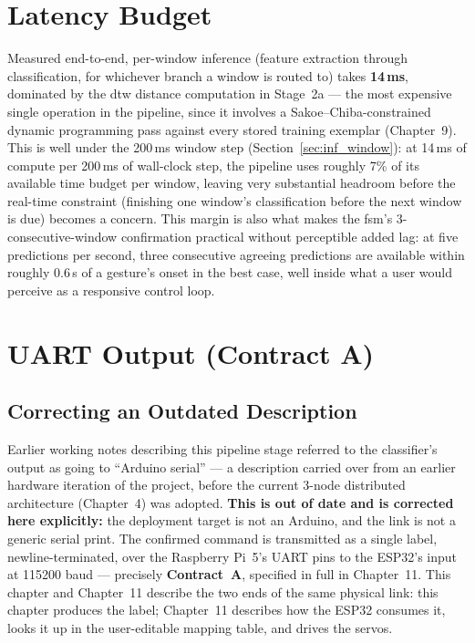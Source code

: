 \section{Latency Budget}
\label{sec:inf_latency}

Measured end-to-end, per-window inference (feature extraction
through classification, for whichever branch a window is routed to)
takes \textbf{14\,ms}, dominated by the \acrshort{dtw} distance
computation in Stage~2a --- the most expensive single operation in
the pipeline, since it involves a Sakoe--Chiba-constrained dynamic
programming pass against every stored training exemplar
(Chapter~9). This is well under the 200\,ms window step
(Section~\ref{sec:inf_window}): at 14\,ms of compute per 200\,ms of
wall-clock step, the pipeline uses roughly 7\% of its available time
budget per window, leaving very substantial headroom before the
real-time constraint (finishing one window's classification before
the next window is due) becomes a concern. This margin is also what
makes the \acrshort{fsm}'s 3-consecutive-window confirmation
practical without perceptible added lag: at five predictions per
second, three consecutive agreeing predictions are available within
roughly 0.6\,s of a gesture's onset in the best case, well inside
what a user would perceive as a responsive control loop.

\section{UART Output (Contract A)}
\label{sec:inf_uart}

\subsection{Correcting an Outdated Description}

Earlier working notes describing this pipeline stage referred to
the classifier's output as going to ``Arduino serial'' --- a
description carried over from an earlier hardware iteration of the
project, before the current 3-node distributed architecture
(Chapter~4) was adopted. \textbf{This is out of date and is
corrected here explicitly:} the deployment target is not an
Arduino, and the link is not a generic serial print. The confirmed
command is transmitted as a single 
label, newline-terminated, over the Raspberry Pi~5's UART pins to
the ESP32's  input at 115200 baud --- precisely
\textbf{Contract~A}, specified in full in Chapter~11. This chapter
and Chapter~11 describe the two ends of the same physical link: this
chapter produces the label; Chapter~11 describes how the ESP32
consumes it, looks it up in the user-editable mapping table, and
drives the servos.

